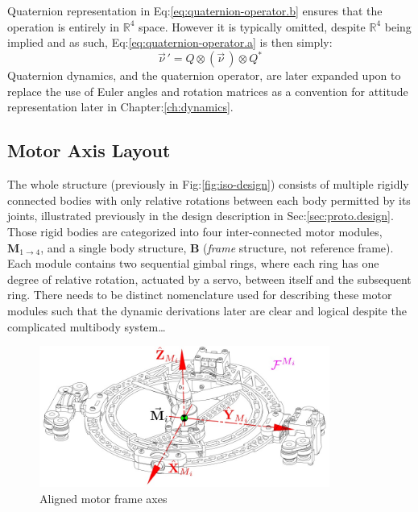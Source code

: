 Quaternion representation in Eq:\ref{eq:quaternion-operator.b} ensures that the operation is entirely in $\mathbb{R}^4$ space. However it is typically omitted, despite $\mathbb{R}^4$ being implied and as such, Eq:\ref{eq:quaternion-operator.a} is then simply:
\begin{equation}
\vec{\nu}^{\hspace{1pt}}\text{}'=Q \otimes (\vec{\nu}\hspace{2pt}) \otimes Q^*
\end{equation}
Quaternion dynamics, and the quaternion operator, are later expanded upon to replace the use of Euler angles and rotation matrices as a convention for attitude representation later in Chapter:\ref{ch:dynamics}.
\newpage
\subsection{Motor Axis Layout}
\label{subsec:proto.conventions.motoraxis}
The whole structure (previously in Fig:\ref{fig:iso-design}) consists of multiple rigidly connected bodies with only relative rotations between each body permitted by its joints, illustrated previously in the design description in Sec:\ref{sec:proto.design}. Those rigid bodies are categorized into four inter-connected motor modules, $\mathbf{M}_{1\rightarrow 4}$, and a single body structure, $\mathbf{B}$ (\emph{frame} structure, not reference frame). Each module contains two sequential gimbal rings, where each ring has one degree of relative rotation, actuated by a servo, between itself and the subsequent ring. There needs to be distinct nomenclature used for describing these motor modules such that the dynamic derivations later are clear and logical despite the complicated multibody system\ldots
\par
\begin{figure}[htbp]
\vspace{-6pt}
\centering
\includegraphics[width=0.85\textwidth]{figs/motor-axes}
\caption{Aligned motor frame axes}
\label{fig:motor-axes}
\vspace{-6pt}
\end{figure}
